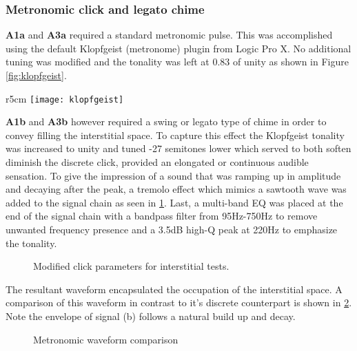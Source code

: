 \subsubsection{Metronomic click and legato chime}
\textbf{A1a} and \textbf{A3a} required a standard metronomic pulse. This was accomplished using the default Klopfgeist (metronome) plugin from Logic Pro X. No additional tuning was modified and the tonality was left at 0.83 of unity as shown in Figure \ref{fig:klopfgeist}.

\begin{wrapfigure}{r}{5cm}
    \centering
    \texttt{[image: klopfgeist]}
    \caption{A1a and A3a metronome}
    \label{fig:klopfgeist}
\end{wrapfigure}

\textbf{A1b} and \textbf{A3b} however required a swing or legato type of chime in order to convey filling the interstitial space. To capture this effect the Klopfgeist tonality was increased to unity and tuned -27 semitones lower which served to both soften diminish the discrete click, provided an elongated or continuous audible sensation. To give the impression of a sound that was ramping up in amplitude and decaying after the peak, a tremolo effect which mimics a sawtooth wave was added to the signal chain as seen in \ref{fig:modClick}. Last, a multi-band EQ was placed at the end of the signal chain with a bandpass filter from 95Hz-750Hz to remove unwanted frequency presence and a 3.5dB high-Q peak at 220Hz to emphasize the tonality.

\begin{figure}[H]
    \centering
    \caption{Modified click parameters for interstitial tests.}
        \qquad
        \qquad
    \label{fig:modClick}
\end{figure}

The resultant waveform encapsulated the occupation of the interstitial space. A comparison of this waveform in contrast to it's discrete counterpart is shown in \ref{fig:click_comparison}. Note the envelope of signal (b) follows a natural build up and decay.

\begin{figure}[H]
    \centering
    \caption{Metronomic waveform comparison}
    \label{fig:click_comparison}
\end{figure}

